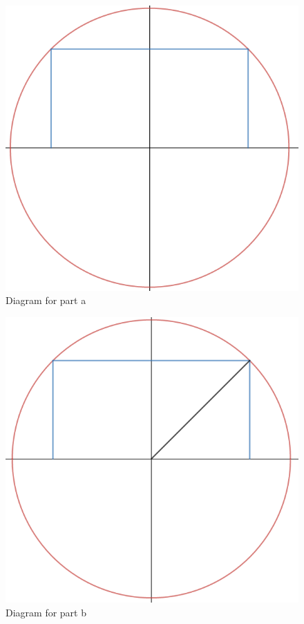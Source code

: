 \documentclass[12pt]{book}
\begin{document}
\begin{enumerate}
\begin{figure}[h]
\centering
\includegraphics[scale=0.25]{Inscribed1.png}
\caption{Diagram for part a}
\end{figure}

\begin{figure}[h]
\centering
\includegraphics[scale=0.25]{Inscribed2.png}
\caption{Diagram for part b}
\end{figure}


\end{enumerate}
\end{document}
